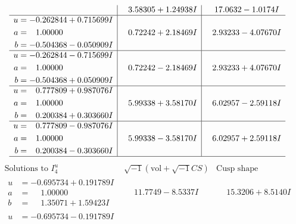 \documentclass[1p]{elsarticle_modified}
\theoremstyle{definition}
\newcommand{\I}{\sqrt{-1}}
\begin{document}
$$\begin{array}{c|c|c}
 & \phantom{-}3.58305 + 1.24938 I & \phantom{-}17.0632 - 1.0174 I \\ \hline\begin{aligned}
u &= -0.262844 + 0.715699 I \\
a &= \phantom{-}1.00000\phantom{ +0.000000I} \\
b &= -0.504368 - 0.050909 I\end{aligned}
 & \phantom{-}0.72242 + 2.18469 I & \phantom{-}2.93233 - 4.07670 I \\ \hline\begin{aligned}
u &= -0.262844 - 0.715699 I \\
a &= \phantom{-}1.00000\phantom{ +0.000000I} \\
b &= -0.504368 + 0.050909 I\end{aligned}
 & \phantom{-}0.72242 - 2.18469 I & \phantom{-}2.93233 + 4.07670 I \\ \hline\begin{aligned}
u &= \phantom{-}0.777809 + 0.987076 I \\
a &= \phantom{-}1.00000\phantom{ +0.000000I} \\
b &= \phantom{-}0.200384 + 0.303660 I\end{aligned}
 & \phantom{-}5.99338 + 3.58170 I & \phantom{-}6.02957 - 2.59118 I \\ \hline\begin{aligned}
u &= \phantom{-}0.777809 - 0.987076 I \\
a &= \phantom{-}1.00000\phantom{ +0.000000I} \\
b &= \phantom{-}0.200384 - 0.303660 I\end{aligned}
 & \phantom{-}5.99338 - 3.58170 I & \phantom{-}6.02957 + 2.59118 I\\
 \hline 
 \end{array}$$\newpage$$\begin{array}{c|c|c}  
\text{Solutions to }I^u_{4}& \I (\text{vol} + \sqrt{-1}CS) & \text{Cusp shape}\\
 \hline 
\begin{aligned}
u &= -0.695734 + 0.191789 I \\
a &= \phantom{-}1.00000\phantom{ +0.000000I} \\
b &= \phantom{-}1.35071 + 1.59423 I\end{aligned}
 & \phantom{-}11.7749 - 8.5337 I & \phantom{-}15.3206 + 8.5140 I \\ \hline\begin{aligned}
u &= -0.695734 - 0.191789 I \\

\end{aligned}
\end{array}$$
\end{document}
